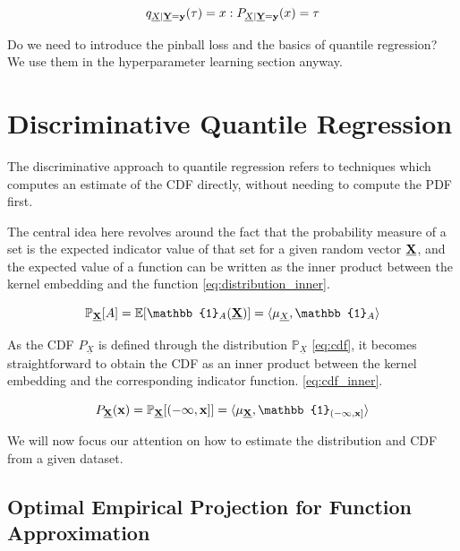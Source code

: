 \documentclass[twoside]{article} \usepackage{aistats2017}
\theoremstyle{definition}
\theoremstyle{remark}
\newcommand{\rv}[1]{\underline{#1}}
\newcommand{\warn}[1]{{\color{RedOrange} #1}}
\begin{document}
		\begin{equation}
			q_{\rv{X} | \bvec{\rv{Y}} = \bvec{y}}(\tau) = x : P_{\rv{X} | \bvec{\rv{Y}} = \bvec{y}}(x) = \tau
		\label{eq:quantile_root_finding}
		\end{equation}	
	
		\warn{Do we need to introduce the pinball loss and the basics of quantile regression? We use them in the hyperparameter learning section anyway.}

\section{Discriminative Quantile Regression}
\label{sec:discriminative_quantile_regression}

	The discriminative approach to quantile regression refers to techniques which computes an estimate of the CDF directly, without needing to compute the PDF first.
	
	The central idea here revolves around the fact that the probability measure of a set is the expected indicator value of that set for a given random vector $\bvec{\rv{X}}$, and the expected value of a function can be written as the inner product between the kernel embedding and the function \eqref{eq:distribution_inner}.
	
	\begin{equation}
		\mathbb{P}_{\bvec{\rv{X}}}[A] = \mathbb{E}[\mathbb{1}_{A}(\bvec{\rv{X}})] = \langle \mu_{\rv{X}}, \mathbb{1}_{A} \rangle
	\label{eq:distribution_inner}
	\end{equation}
	
	As the CDF $P_{\rv{X}}$ is defined through the distribution $\mathbb{P}_{\rv{X}}$ \eqref{eq:cdf}, it becomes straightforward to obtain the CDF as an inner product between the kernel embedding and the corresponding indicator function. \eqref{eq:cdf_inner}.
	
	\begin{equation}
		P_{\bvec{\rv{X}}}(\bvec{x}) = \mathbb{P}_{\bvec{\rv{X}}}[(-\bvec{\infty}, \bvec{x}]] = \langle \mu_{\bvec{\rv{X}}}, \mathbb{1}_{(-\bvec{\infty}, \bvec{x}]} \rangle
	\label{eq:cdf_inner}
	\end{equation}
	
	We will now focus our attention on how to estimate the distribution and CDF from a given dataset.
	
	\subsection{Optimal Empirical Projection for Function Approximation}
	\label{sec:discriminative_quantile_regression:optimal_function_approximation}
	
\end{document}
